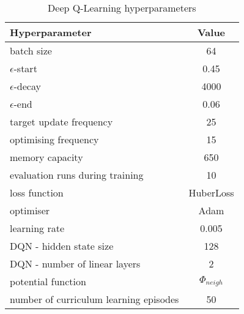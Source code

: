 \begin{table}[ht]
\centering
\begin{threeparttable}
\begin{tabular}{l|c}
\toprule
Hyperparameter             &     Value \\
\midrule
batch size               &     64 \\ 
$\epsilon$-start               &    0.45 \\ 
$\epsilon$-decay         &     4000\\
$\epsilon$-end              &     0.06 \\
target update frequency               &     25 \\ 
optimising frequency          &     15 \\ 
memory capacity     &     650 \\
evaluation runs during training             &     10 \\
loss function               &     HuberLoss \\ 
optimiser        &     Adam \\
learning rate             &     0.005 \\
DQN - hidden state size               &     128 \\ 
DQN - number of linear layers     &     2 \\
potential function            &    $\Phi_{neigh}$ \\
number of curriculum learning episodes            & 50 \\ 
\bottomrule
\end{tabular}
\end{threeparttable}
\caption{\textsc{\GraphicalTwoChoice} Deep Q-Learning hyperparameters}
\label{tab:graphical-two-choice-hyperparameters}
\end{table}